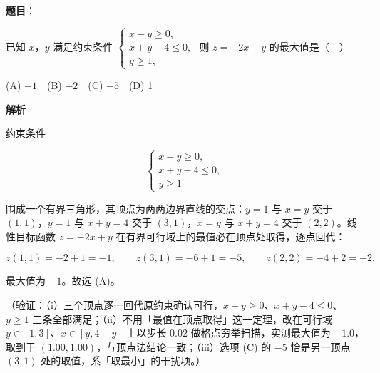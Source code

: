 \begin{answer}

\textbf{题目}：

已知 \(x\)，\(y\) 满足约束条件 \(\begin{cases}x-y\geqslant 0,\\x+y-4\leqslant 0,\\y\geqslant 1,\end{cases}\) 则 \(z=-2x+y\) 的最大值是（　）

(A) \(-1\)　(B) \(-2\)　(C) \(-5\)　(D) 1

\textbf{解析}

约束条件

\nopagebreak[4]
\[
\begin{cases}
x-y\geqslant 0,\\
x+y-4\leqslant 0,\\
y\geqslant 1
\end{cases}
\]

围成一个有界三角形，其顶点为两两边界直线的交点：\(y=1\) 与 \(x=y\) 交于 \((1,1)\)，\(y=1\) 与 \(x+y=4\) 交于 \((3,1)\)，\(x=y\) 与 \(x+y=4\) 交于 \((2,2)\)。线性目标函数 \(z=-2x+y\) 在有界可行域上的最值必在顶点处取得，逐点回代：

\nopagebreak[4]
\[
z(1,1)=-2+1=-1,\qquad z(3,1)=-6+1=-5,\qquad z(2,2)=-4+2=-2.
\]

最大值为 \(-1\)。故选 (A)。

（验证：（i）三个顶点逐一回代原约束确认可行，\(x-y\geqslant 0\)、\(x+y-4\leqslant 0\)、\(y\geqslant 1\) 三条全部满足；（ii）不用「最值在顶点取得」这一定理，改在可行域 \(y\in[1,3]\)、\(x\in[y,4-y]\) 上以步长 \(0.02\) 做格点穷举扫描，实测最大值为 \(-1.0\)，取到于 \((1.00,1.00)\)，与顶点法结论一致；（iii）选项 (C) 的 \(-5\) 恰是另一顶点 \((3,1)\) 处的取值，系「取最小」的干扰项。）


\end{answer}
